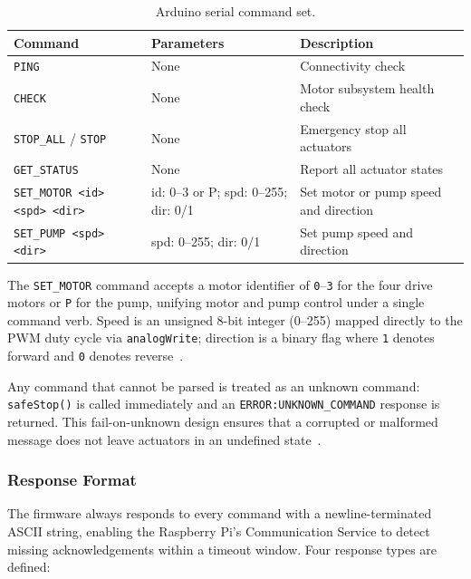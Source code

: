 \begin{table}[h]
\centering
\caption{Arduino serial command set.}
\label{tab:commands}
\begin{tabular}{p{4.5cm} p{3cm} p{4.5cm}}
\hline
\textbf{Command} & \textbf{Parameters} & \textbf{Description} \\
\hline
\texttt{PING}                       & None                         & Connectivity check \\
\texttt{CHECK}                      & None                         & Motor subsystem health check \\
\texttt{STOP\_ALL} / \texttt{STOP}  & None                         & Emergency stop all actuators \\
\texttt{GET\_STATUS}                & None                         & Report all actuator states \\
\texttt{SET\_MOTOR <id> <spd> <dir>} & id: 0--3 or P; spd: 0--255; dir: 0/1 & Set motor or pump speed and direction \\
\texttt{SET\_PUMP <spd> <dir>}      & spd: 0--255; dir: 0/1        & Set pump speed and direction \\
\hline
\end{tabular}
\end{table}

\noindent The \texttt{SET\_MOTOR} command accepts a motor identifier
of \texttt{0}--\texttt{3} for the four drive motors or \texttt{P}
for the pump, unifying motor and pump control under a single command
verb. Speed is an unsigned 8-bit integer (0--255) mapped directly to
the PWM duty cycle via \texttt{analogWrite}; direction is a binary
flag where \texttt{1} denotes forward and \texttt{0} denotes
reverse~\cite{monk2016electronics}.

Any command that cannot be parsed is treated as an unknown command:
\texttt{safeStop()} is called immediately and an
\texttt{ERROR:UNKNOWN\_COMMAND} response is returned. This
fail-on-unknown design ensures that a corrupted or malformed message
does not leave actuators in an undefined state~\cite{kopetz2011real}.

\subsubsection{Response Format}

The firmware always responds to every command with a newline-terminated
ASCII string, enabling the Raspberry Pi's Communication Service to
detect missing acknowledgements within a timeout window. Four response
types are defined:

